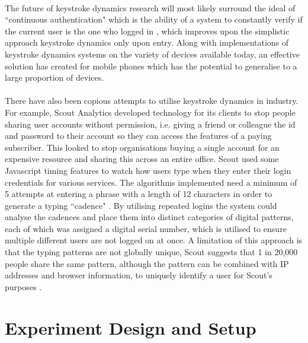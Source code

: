 \documentclass{article}
\begin{document}
\paragraph{}

The future of keystroke dynamics research will most likely surround the ideal of ``continuous authentication" which is the ability of a system  to constantly verify if the current user is the one who logged in \parencite{sznur2015advances}, which improves upon the simplistic approach keystroke dynamics only upon entry. Along with implementations of keystroke dynamics systems on the variety of devices available today, an effective solution has created for mobile phones \parencite{maiorana2011keystroke} which has the potential to generalise to a large proportion of devices.  

\paragraph{}
There have also been copious attempts to utilise keystroke dynamics in industry. For example, Scout Analytics developed technology for its clients to stop people sharing user accounts without permission, i.e. giving a friend or colleague the id and password to their account so they can access the features of a paying subscriber. This looked to stop organisations buying a single account for an expensive resource and sharing this across an entire office. Scout used some Javascript timing features to watch how users type when they enter their login credentials for various services. The algorithms implemented need a minimum of 5 attempts at entering a phrase with a length of 12 characters in order to generate a typing ``cadence" \parencite{arsTech}. By utilising repeated logins the system could analyse the cadences and place them into distinct categories of digital patterns, each of which was assigned a digital serial number, which is utilised to ensure multiple different users are not logged on at once. A limitation of this approach is that the typing patterns are not globally unique, Scout suggests that 1 in 20,000 people share the same pattern, although the pattern can be combined with IP addresses and browser information, to uniquely identify a user for Scout's purposes \parencite{arsTech}. 

\section{Experiment Design and Setup} \label{experiment}
\end{document}
